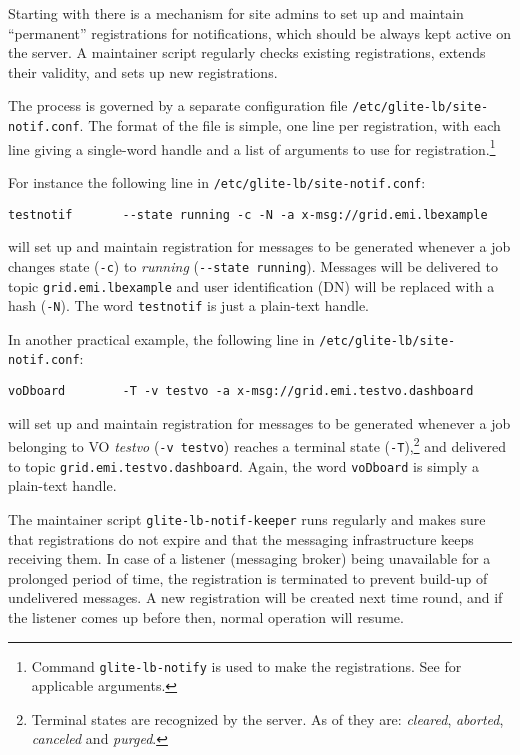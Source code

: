 Starting with  there is a mechanism for site admins to set up and maintain ``permanent'' registrations for notifications, which should be always kept active on the server. A maintainer script regularly checks existing registrations, extends their validity, and sets up new registrations.

The process is governed by a separate configuration file \texttt{/etc/glite-lb/site-notif.conf}. The format of the file is simple, one line per registration, with each line giving a single-word handle and a list of arguments to use for registration.\footnote{Command \texttt{glite-lb-notify} is used to make the registrations. See \cite{lbug} for applicable arguments.}

For instance the following line in \texttt{/etc/glite-lb/site-notif.conf}:

\begin{verbatim}
testnotif       --state running -c -N -a x-msg://grid.emi.lbexample
\end{verbatim}

\indent{}will set up and maintain registration for messages to be generated whenever a job changes state (\texttt{-c}) to \emph{running} (\texttt{-{}-state running}). Messages will be delivered to topic \texttt{grid.emi.lbexample} and user identification (DN) will be replaced with a hash (\texttt{-N}). The word \texttt{testnotif} is just a plain-text handle.

In another practical example, the following line in \texttt{/etc/glite-lb/site-notif.conf}:

\begin{verbatim}
voDboard        -T -v testvo -a x-msg://grid.emi.testvo.dashboard
\end{verbatim}

\indent{}will set up and maintain registration for messages to be generated whenever a job belonging to VO \emph{testvo} (\texttt{-v testvo}) reaches a terminal state (\texttt{-T}),\footnote{Terminal states are recognized by the server. As of  they are: \emph{cleared}, \emph{aborted}, \emph{canceled} and \emph{purged}.} and delivered to topic \texttt{grid.emi.testvo.dashboard}. Again, the word \texttt{voDboard} is simply a plain-text handle.

The maintainer script \texttt {glite-lb-notif-keeper} runs regularly and makes sure that registrations do not expire and that the messaging infrastructure keeps receiving them. In case of a listener (messaging broker) being unavailable for a prolonged period of time, the registration is terminated to prevent build-up of undelivered messages. A new registration will be created next time round, and if the listener comes up before then, normal operation will resume.

